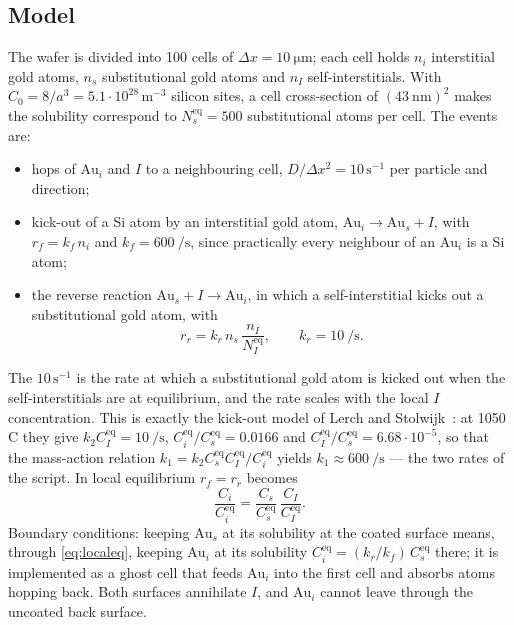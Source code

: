 \documentclass[11pt,a4paper]{article}
\numberwithin{equation}{section}
\theoremstyle{remark}
\begin{document}
\subsection{Model}\label{sec:komodel}

The wafer is divided into 100 cells of $\Delta x = \SI{10}{\micro\metre}$; each cell holds $n_i$
interstitial gold atoms, $n_s$ substitutional gold atoms and $n_I$ self-interstitials. With
$C_0 = 8/a^3 = 5.1\cdot10^{28}\,\mathrm{m^{-3}}$ silicon sites, a cell cross-section of
$(\SI{43}{\nano\metre})^2$ makes the solubility correspond to $N_s^{\mathrm{eq}} = 500$ substitutional
atoms per cell. The events are:
\begin{itemize}\setlength{\itemsep}{2pt}
  \item hops of $\mathrm{Au}_i$ and $I$ to a neighbouring cell, $D/\Delta x^2 = 10\,\mathrm{s^{-1}}$ per
    particle and direction;
  \item kick-out of a Si atom by an interstitial gold atom, $\mathrm{Au}_i \to \mathrm{Au}_s + I$, with
    $r_f = k_f\,n_i$ and $k_f = \SI{600}{\per\second}$, since practically every neighbour of an
    $\mathrm{Au}_i$ is a Si atom;
  \item the reverse reaction $\mathrm{Au}_s + I \to \mathrm{Au}_i$, in which a self-interstitial
    kicks out a substitutional gold atom, with
    \begin{equation}\label{eq:reverse}
      r_r = k_r\,n_s\,\frac{n_I}{N_I^{\mathrm{eq}}},\qquad k_r = \SI{10}{\per\second}.
    \end{equation}
\end{itemize}
The $10\,\mathrm{s^{-1}}$ is the rate at which a substitutional gold atom is kicked out when the
self-interstitials are at equilibrium, and the rate scales with the local $I$ concentration. This is
exactly the kick-out model of Lerch and Stolwijk~\citep{lerch1998}: at 1050\,\textdegree C they give
$k_2C_I^{\mathrm{eq}} = \SI{10}{\per\second}$, $C_i^{\mathrm{eq}}/C_s^{\mathrm{eq}} = 0.0166$ and
$C_I^{\mathrm{eq}}/C_s^{\mathrm{eq}} = 6.68\cdot10^{-5}$, so that the mass-action relation
$k_1 = k_2C_s^{\mathrm{eq}}C_I^{\mathrm{eq}}/C_i^{\mathrm{eq}}$ yields $k_1 \approx \SI{600}{\per\second}$
--- the two rates of the script. In local equilibrium $r_f = r_r$ becomes
\begin{equation}\label{eq:localeq}
  \frac{C_i}{C_i^{\mathrm{eq}}} = \frac{C_s}{C_s^{\mathrm{eq}}}\,\frac{C_I}{C_I^{\mathrm{eq}}}.
\end{equation}
Boundary conditions: keeping $\mathrm{Au}_s$ at its solubility at the coated surface means, through
\cref{eq:localeq}, keeping $\mathrm{Au}_i$ at its solubility
$C_i^{\mathrm{eq}} = (k_r/k_f)\,C_s^{\mathrm{eq}}$ there; it is implemented as a ghost cell that feeds
$\mathrm{Au}_i$ into the first cell and absorbs atoms hopping back. Both surfaces annihilate $I$, and
$\mathrm{Au}_i$ cannot leave through the uncoated back surface.
\end{document}
